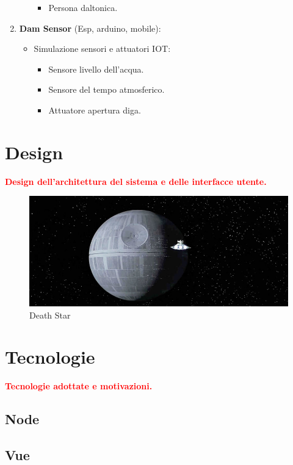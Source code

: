 \documentclass{report}
\begin{document}
\begin{enumerate}
\begin{itemize}
\begin{itemize}
			\item Persona daltonica.
		\end{itemize}
	\end{itemize}
	\item \textbf{Dam Sensor} (Esp, arduino, mobile):
	\begin{itemize}
		\item Simulazione sensori e attuatori IOT:
		\begin{itemize}
			\item Sensore livello dell'acqua.
			\item Sensore del tempo atmosferico.
			\item Attuatore apertura diga.
		\end{itemize}
	\end{itemize}
\end{enumerate}

\section{Design}
\textcolor{red}{\textbf{Design dell'architettura del sistema e delle interfacce utente.}}

\begin{figure}[h!]
\centering
\includegraphics[scale=0.44]{deathStar2.jpg}
\caption{Death Star}
\label{fig:deathstar}
\end{figure}

\section{Tecnologie}
\textcolor{red}{\textbf{Tecnologie adottate e motivazioni.}}
\subsection{Node}
\subsection{Vue}
\end{document}
